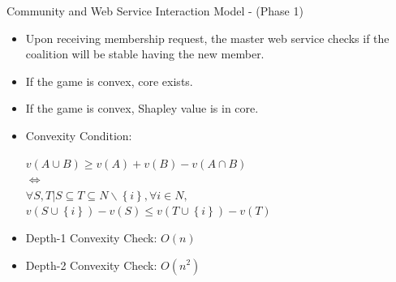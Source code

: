 \documentclass{beamer}
\begin{document}
\begin{frame}{Community and Web Service Interaction Model - (Phase 1)}


    \begin{itemize}
        \item Upon receiving membership request, the master web service checks if the coalition will be stable having the new member.
        \item If the game is convex, core exists.
        \item If the game is convex, Shapley value is in core.
        \item Convexity Condition:
        \begin{center}
          $v(A \cup B) \geq v(A) + v(B) - v(A \cap B)$ \\
          $\Leftrightarrow$  \\
          $\forall S,T | S \subseteq T \subseteq N \backslash \left\{i\right\}, \forall i \in N,$ \\
          {\color{blue} $v(S \cup \left\{i\right\}) - v(S) \leq v (T \cup \left\{i\right\}) - v(T)$ }
        \end{center}
        \item Depth-1 Convexity Check: $O(n)$
        \item Depth-2 Convexity Check: $O(n^2)$
    \end{itemize}
       	
\end{frame}
\end{document}
